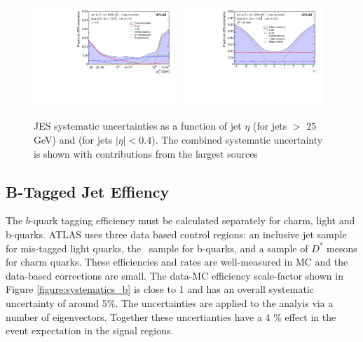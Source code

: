 \begin{figure}[htbp]
\begin{center}
\includegraphics[width=0.48\textwidth]{figs/systematics/fig_61a}
\includegraphics[width=0.48\textwidth]{figs/systematics/fig_61c}
\caption{JES systematic uncertainties as a function of jet $\eta$ (for jets \pt $>$ 25 GeV) and \pt (for jets $|\eta|<0.4$). The combined systematic uncertainty is shown with contributions from the largest sources}
\label{figure:systematics_jes}
\end{center}
\end{figure}


\subsection{B-Tagged Jet Effiency}

The $b$-quark tagging efficiency must be calculated separately for charm, light and b-quarks. ATLAS uses three data based control regions: an inclusive jet sample for mis-tagged light quarks\cite{mistagratecalibration}, the \ttbar\ sample for b-quarks\cite{bjetcalibration}, and a sample of $D^{*}$ mesons for charm quarks\cite{cjetcalibration}. These efficiencies and rates are well-measured in MC and the data-based corrections are small. The data-MC efficiency scale-factor shown in Figure \ref{figure:systematics_b} is close to 1 and has an overall systematic uncertainty of around 5\%. The uncertainties are applied to the analyis via a number of eigenvectors. Together these uncertianties have a 4 \% effect in the event expectation in the signal regions. 


